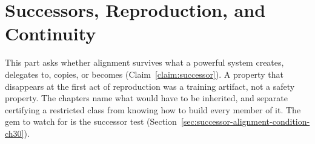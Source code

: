 \part{Successors, Reproduction, and Continuity}

This part asks whether alignment survives what a powerful system creates, delegates to, copies, or becomes (Claim~\ref{claim:successor}).
A property that disappears at the first act of reproduction was a training artifact, not a safety property.
The chapters name what would have to be inherited, and separate certifying a restricted class from knowing how to build every member of it.
The gem to watch for is the successor test (Section~\ref{sec:successor-alignment-condition-ch30}).





